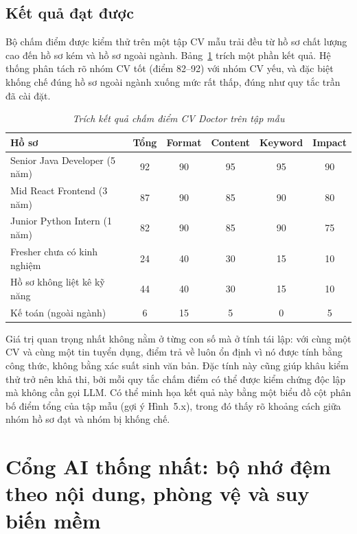 \documentclass[../DoAn.tex]{subfiles}
\begin{document}
\subsection{Kết quả đạt được}

Bộ chấm điểm được kiểm thử trên một tập CV mẫu trải đều từ hồ sơ chất lượng cao đến hồ sơ kém và hồ sơ ngoài ngành. Bảng~\ref{tab:ch5-cvdoctor} trích một phần kết quả. Hệ thống phân tách rõ nhóm CV tốt (điểm 82--92) với nhóm CV yếu, và đặc biệt khống chế đúng hồ sơ ngoài ngành xuống mức rất thấp, đúng như quy tắc trần đã cài đặt.

\begin{table}[ht]
\centering
\caption{\textit{Trích kết quả chấm điểm CV Doctor trên tập mẫu}}
\label{tab:ch5-cvdoctor}
\renewcommand{\arraystretch}{1.25}
\begin{tabular}{|p{5.0cm}|c|c|c|c|c|}
\hline
\textbf{Hồ sơ} & \textbf{Tổng} & \textbf{Format} & \textbf{Content} & \textbf{Keyword} & \textbf{Impact} \\ \hline
Senior Java Developer (5 năm) & 92 & 90 & 95 & 95 & 90 \\ \hline
Mid React Frontend (3 năm) & 87 & 90 & 85 & 90 & 80 \\ \hline
Junior Python Intern (1 năm) & 82 & 90 & 85 & 90 & 75 \\ \hline
Fresher chưa có kinh nghiệm & 24 & 40 & 30 & 15 & 10 \\ \hline
Hồ sơ không liệt kê kỹ năng & 44 & 40 & 30 & 15 & 10 \\ \hline
Kế toán (ngoài ngành) & 6 & 15 & 5 & 0 & 5 \\ \hline
\end{tabular}
\end{table}

Giá trị quan trọng nhất không nằm ở từng con số mà ở tính tái lập: với cùng một CV và cùng một tin tuyển dụng, điểm trả về luôn ổn định vì nó được tính bằng công thức, không bằng xác suất sinh văn bản. Đặc tính này cũng giúp khâu kiểm thử trở nên khả thi, bởi mỗi quy tắc chấm điểm có thể được kiểm chứng độc lập mà không cần gọi LLM. Có thể minh họa kết quả này bằng một biểu đồ cột phân bố điểm tổng của tập mẫu (gợi ý Hình~5.x), trong đó thấy rõ khoảng cách giữa nhóm hồ sơ đạt và nhóm bị khống chế.

\section{Cổng AI thống nhất: bộ nhớ đệm theo nội dung, phòng vệ và suy biến mềm}
\label{sec:ch5-gateway}
\end{document}

